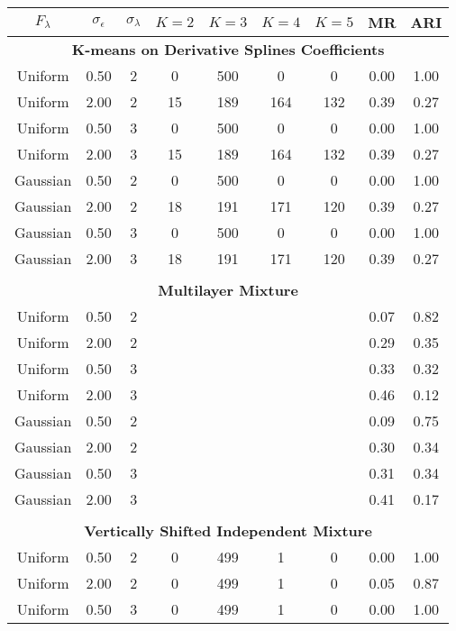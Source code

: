 \begin{table}[ht]
\centering
\begin{tabular}{ccc|cccccc}
  \thickhline$F_{\lambda}$&$\sigma_{\epsilon}$&$\sigma_{\lambda}$&$K=2$&$K=3$&$K=4$&$K=5$&MR&ARI\\ \hline\multicolumn{9}{c}{\textbf{K-means on Derivative Splines Coefficients}}\\ Uniform & 0.50 &   2 & 0 & 500 & 0 & 0 & 0.00 & 1.00 \\ 
  Uniform & 2.00 &   2 & 15 & 189 & 164 & 132 & 0.39 & 0.27 \\ 
  Uniform & 0.50 &   3 & 0 & 500 & 0 & 0 & 0.00 & 1.00 \\ 
  Uniform & 2.00 &   3 & 15 & 189 & 164 & 132 & 0.39 & 0.27 \\ 
  Gaussian & 0.50 &   2 & 0 & 500 & 0 & 0 & 0.00 & 1.00 \\ 
  Gaussian & 2.00 &   2 & 18 & 191 & 171 & 120 & 0.39 & 0.27 \\ 
  Gaussian & 0.50 &   3 & 0 & 500 & 0 & 0 & 0.00 & 1.00 \\ 
  Gaussian & 2.00 &   3 & 18 & 191 & 171 & 120 & 0.39 & 0.27 \\ 
   \\ \multicolumn{9}{c}{\textbf{Multilayer Mixture}}\\Uniform & 0.50 &   2 &  &  &  &  & 0.07 & 0.82 \\ 
  Uniform & 2.00 &   2 &  &  &  &  & 0.29 & 0.35 \\ 
  Uniform & 0.50 &   3 &  &  &  &  & 0.33 & 0.32 \\ 
  Uniform & 2.00 &   3 &  &  &  &  & 0.46 & 0.12 \\ 
  Gaussian & 0.50 &   2 &  &  &  &  & 0.09 & 0.75 \\ 
  Gaussian & 2.00 &   2 &  &  &  &  & 0.30 & 0.34 \\ 
  Gaussian & 0.50 &   3 &  &  &  &  & 0.31 & 0.34 \\ 
  Gaussian & 2.00 &   3 &  &  &  &  & 0.41 & 0.17 \\ 
   \\ \multicolumn{9}{c}{\textbf{Vertically Shifted Independent Mixture}}\\Uniform & 0.50 &   2 & 0 & 499 & 1 & 0 & 0.00 & 1.00 \\ 
  Uniform & 2.00 &   2 & 0 & 499 & 1 & 0 & 0.05 & 0.87 \\ 
  Uniform & 0.50 &   3 & 0 & 499 & 1 & 0 & 0.00 & 1.00 \\ 

\end{tabular}
\end{table}
